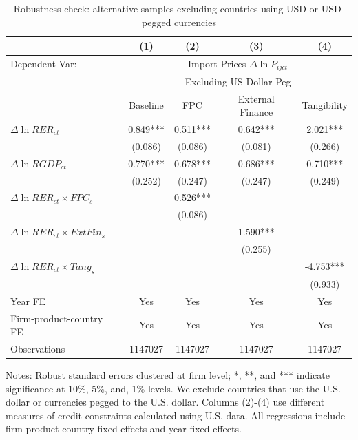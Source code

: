 \begin{table}[H]
	\centering
	\caption{Robustness check: alternative samples excluding countries using USD or USD-pegged currencies}
	\begin{threeparttable}
	\begin{tabular}{lcccc}
		\toprule
		& (1)   & (2)   & (3)   & (4) \\
		\midrule
            Dependent Var: & \multicolumn{4}{c}{ Import Prices $\Delta \ln P_{ijct}$} \\
		& \multicolumn{4}{c}{Excluding US Dollar Peg} \\
		& Baseline & FPC   & External Finance & Tangibility \\
		\midrule
		$\Delta \ln RER_{ct}$ & 0.849*** & 0.511*** & 0.642*** & 2.021*** \\
		& (0.086) & (0.086) & (0.081) & (0.266) \\
		$\Delta \ln RGDP_{ct}$ & 0.770*** & 0.678*** & 0.686*** & 0.710*** \\
		& (0.252) & (0.247) & (0.247) & (0.249) \\
		$\Delta \ln RER_{ct} \times FPC_{s}$ &    & 0.526*** &       &  \\
            & & (0.086) &       &  \\
		$\Delta \ln RER_{ct} \times ExtFin_{s}$ & &       & 1.590*** &  \\
		& &       & (0.255) &  \\
		$\Delta \ln RER_{ct} \times Tang_{s}$ & &       &       & -4.753*** \\
		& &       &       & (0.933) \\
            \midrule
		Year FE  &   Yes    & Yes   & Yes   & Yes \\
		Firm-product-country FE &   Yes    & Yes   & Yes   & Yes \\
		Observations & 1147027 & 1147027 & 1147027 & 1147027 \\
		\bottomrule
	\end{tabular}
	\begin{tablenotes}
		\footnotesize
		\item Notes: Robust standard errors clustered at firm level; *, **, and *** indicate significance at 10\%, 5\%, and, 1\% levels. We exclude countries that use the U.S. dollar or currencies pegged to the U.S. dollar. Columns (2)-(4) use different measures of credit constraints calculated using U.S. data. All regressions include firm-product-country fixed effects and year fixed effects.
	\end{tablenotes}
        \end{threeparttable}
        \label{tab.robust.nopeg}
\end{table}

